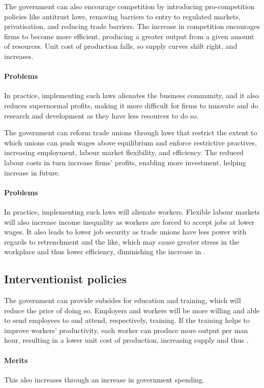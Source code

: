 \documentclass[Economics.tex]{subfiles}
\begin{document}
The government can also encourage competition by introducing pro-competition policies like antitrust laws, removing barriers to entry to regulated markets, privatisation, and reducing trade barriers. The increase in competition encourages firms to become more efficient, producing a greater output from a given amount of resources. Unit cost of production falls, so supply curves shift right, and \AS{} increases.

\paragraph{Problems} In practice, implementing such laws alienates the business community, and it also reduces supernormal profits, making it more difficult for firms to innovate and do research and development as they have less resources to do so.

The government can reform trade unions through laws that restrict the extent to which unions can push wages above equilibrium and enforce restrictive practives, increasing employment, labour market flexibility, and efficiency. The reduced labour costs in turn increase firms' profits, enabling more investment, helping \AS{} increase in future.

\paragraph{Problems} In practice, implementing such laws will alienate workers. Flexible labour markets will also increase income inequality as workers are forced to accept jobs at lower wages. It also leads to lower job security as trade unions have less power with regards to retrenchment and the like, which may cause greater stress in the workplace and thus lower efficiency, diminishing the increase in \AS{}.
\subsection{Interventionist policies}
The government can provide subsides for education and training, which will reduce the price of doing so. Employers and workers will be more willing and able to send employees to and attend, respectively, training. If the training helps to improve workers' productivity, each worker can produce more output per man hour, resulting in a lower unit cost of production, increasing supply and thus \AS{}.

\paragraph{Merits} This also increases \AD{} through an increase in government spending.
\end{document}
